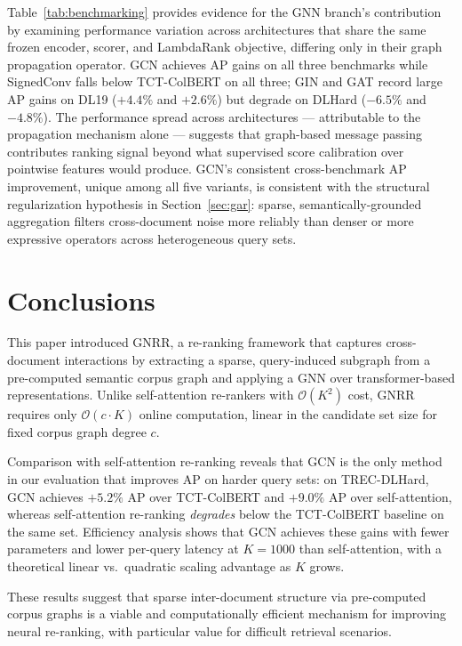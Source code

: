 \documentclass[runningheads]{llncs}
\newcommand{\ModelName}{GNRR\xspace}
\begin{document}
Table~\ref{tab:benchmarking} provides evidence for the GNN branch's contribution by examining performance variation across architectures that share the same frozen encoder, scorer, and LambdaRank objective, differing only in their graph propagation operator. GCN achieves AP gains on all three benchmarks while SignedConv falls below TCT-ColBERT on all three; GIN and GAT record large AP gains on DL19 ($+4.4\%$ and $+2.6\%$) but degrade on DLHard ($-6.5\%$ and $-4.8\%$). The performance spread across architectures — attributable to the propagation mechanism alone — suggests that graph-based message passing contributes ranking signal beyond what supervised score calibration over pointwise features would produce. GCN's consistent cross-benchmark AP improvement, unique among all five variants, is consistent with the structural regularization hypothesis in Section~\ref{sec:gar}: sparse, semantically-grounded aggregation filters cross-document noise more reliably than denser or more expressive operators across heterogeneous query sets. %

\section{Conclusions}
This paper introduced \ModelName, a re-ranking framework that captures cross-document interactions by extracting a sparse, query-induced subgraph from a pre-computed semantic corpus graph and applying a GNN over transformer-based representations. Unlike self-attention re-rankers with $\mathcal{O}(K^2)$ cost, \ModelName requires only $\mathcal{O}(c \cdot K)$ online computation, linear in the candidate set size for fixed corpus graph degree $c$.

Comparison with self-attention re-ranking reveals that GCN is the only method in our evaluation that improves AP on harder query sets: on TREC-DLHard, GCN achieves $+5.2\%$ AP over TCT-ColBERT and $+9.0\%$ AP over self-attention, whereas self-attention re-ranking \emph{degrades} below the TCT-ColBERT baseline on the same set. Efficiency analysis shows that GCN achieves these gains with fewer parameters and lower per-query latency at $K=1000$ than self-attention, with a theoretical linear vs.\ quadratic scaling advantage as $K$ grows.

These results suggest that sparse inter-document structure via pre-computed corpus graphs is a viable and computationally efficient mechanism for improving neural re-ranking, with particular value for difficult retrieval scenarios.
\end{document}
